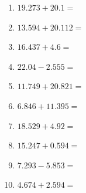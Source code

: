 \documentclass[12pt]{article}
\begin{document}
\begin{enumerate}
\newpage
\item \large $ 19.273 + 20.1 = $ \vspace{1.5cm}
\item \large $ 13.594 + 20.112 = $ \vspace{1.5cm}
\item \large $ 16.437 + 4.6 = $ \vspace{1.5cm}
\item \large $ 22.04 - 2.555 = $ \vspace{1.5cm}
\item \large $ 11.749 + 20.821 = $ \vspace{1.5cm}
\item \large $ 6.846 + 11.395 = $ \vspace{1.5cm}
\item \large $ 18.529 + 4.92 = $ \vspace{1.5cm}
\item \large $ 15.247 + 0.594 = $ \vspace{1.5cm}
\item \large $ 7.293 - 5.853 = $ \vspace{1.5cm}
\item \large $ 4.674 + 2.594 = $ \vspace{1.5cm}
\end{enumerate}\newpage
\end{document}
